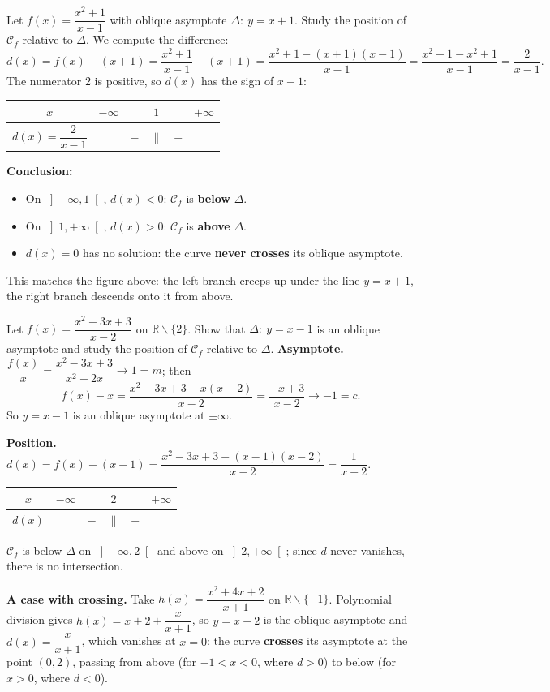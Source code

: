 \documentclass[11pt]{article}
\def\setminus{\mathbin{\backslash}}\let\smallsetminus\setminus
\begin{document}
\begin{exoresolu}
Let $f(x)=\dfrac{x^{2}+1}{x-1}$ with oblique asymptote $\Delta:\ y=x+1$. Study the position of $\mathcal{C}_f$ relative to $\Delta$.
\tcblower
We compute the difference:
\[ d(x)=f(x)-(x+1)=\frac{x^{2}+1}{x-1}-(x+1)=\frac{x^{2}+1-(x+1)(x-1)}{x-1}=\frac{x^{2}+1-x^{2}+1}{x-1}=\frac{2}{x-1}. \]
The numerator $2$ is positive, so $d(x)$ has the sign of $x-1$:
\begin{center}
\begin{tabular}{|c|ccccc|}
\hline
$x$ & $-\infty$ & & $1$ & & $+\infty$ \\
\hline
$d(x)=\dfrac{2}{x-1}$ & & $-$ & $\|$ & $+$ & \\
\hline
\end{tabular}
\end{center}
\textbf{Conclusion:}
\begin{itemize}
\item On $\left]-\infty,1\right[$, $d(x)<0$: $\mathcal{C}_f$ is \textbf{below} $\Delta$.
\item On $\left]1,+\infty\right[$, $d(x)>0$: $\mathcal{C}_f$ is \textbf{above} $\Delta$.
\item $d(x)=0$ has no solution: the curve \textbf{never crosses} its oblique asymptote.
\end{itemize}
This matches the figure above: the left branch creeps up under the line $y=x+1$, the right branch descends onto it from above.
\end{exoresolu}

\begin{exoresolu}
Let $f(x)=\dfrac{x^{2}-3x+3}{x-2}$ on $\mathbb{R}\setminus\{2\}$. Show that $\Delta:\ y=x-1$ is an oblique asymptote and study the position of $\mathcal{C}_f$ relative to $\Delta$.
\tcblower
\textbf{Asymptote.} $\dfrac{f(x)}{x}=\dfrac{x^{2}-3x+3}{x^{2}-2x}\to 1=m$; then
\[ f(x)-x=\frac{x^{2}-3x+3-x(x-2)}{x-2}=\frac{-x+3}{x-2}\to -1=c. \]
So $y=x-1$ is an oblique asymptote at $\pm\infty$.

\textbf{Position.} $d(x)=f(x)-(x-1)=\dfrac{x^{2}-3x+3-(x-1)(x-2)}{x-2}=\dfrac{1}{x-2}$.

\begin{center}
\begin{tabular}{|c|ccccc|}
\hline
$x$ & $-\infty$ & & $2$ & & $+\infty$ \\
\hline
$d(x)$ & & $-$ & $\|$ & $+$ & \\
\hline
\end{tabular}
\end{center}
$\mathcal{C}_f$ is below $\Delta$ on $\left]-\infty,2\right[$ and above on $\left]2,+\infty\right[$; since $d$ never vanishes, there is no intersection.

\textbf{A case with crossing.} Take $h(x)=\dfrac{x^{2}+4x+2}{x+1}$ on $\mathbb{R}\setminus\{-1\}$. Polynomial division gives $h(x)=x+2+\dfrac{x}{x+1}$, so $y=x+2$ is the oblique asymptote and $d(x)=\dfrac{x}{x+1}$, which vanishes at $x=0$: the curve \textbf{crosses} its asymptote at the point $(0,2)$, passing from above (for $-1<x<0$, where $d>0$) to below (for $x>0$, where $d<0$).
\end{exoresolu}
\end{document}
